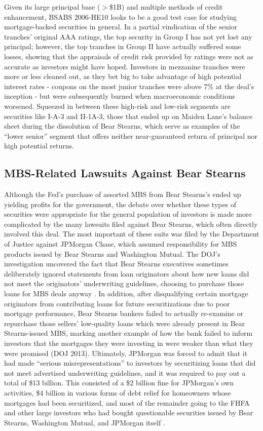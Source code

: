 \documentclass[12pt]{article}
\begin{document}
Given its large principal base ($>$\$1B) and multiple methods of credit enhancement, BSABS 2006-HE10 looks to be a good test case for studying mortgage-backed securities in general. In a partial vindication of the senior tranches’ original AAA ratings, the top security in Group I has not yet lost any principal; however, the top tranches in Group II have actually suffered some losses, showing that the appraisals of credit risk provided by ratings were not as accurate as investors might have hoped. Investors in mezzanine tranches were more or less cleaned out, as they bet big to take advantage of high potential interest rates - coupons on the most junior tranches were above 7\% at the deal’s inception - but were subsequently burned when macroeconomic conditions worsened. Squeezed in between these high-risk and low-risk segments are securities like I-A-3 and II-1A-3, those that ended up on Maiden Lane’s balance sheet during the dissolution of Bear Stearns, which serve as examples of the “lower senior” segment that offers neither near-guaranteed return of principal nor high potential returns.

\subsection*{MBS-Related Lawsuits Against Bear Stearns}

Although the Fed’s purchase of assorted MBS from Bear Stearns’s ended up yielding profits for the government, the debate over whether these types of securities were appropriate for the general population of investors is made more complicated by the many lawsuits filed against Bear Stearns, which often directly involved this deal. The most important of these suits was filed by the Department of Justice against JPMorgan Chase, which assumed responsibility for MBS products issued by Bear Stearns and Washington Mutual. The DOJ’s investigation uncovered the fact that Bear Stearns executives sometimes deliberately ignored statements from loan originators about how new loans did not meet the originators’ underwriting guidelines, choosing to purchase those loans for MBS deals anyway \parencite{ftc08}. In addition, after disqualifying certain mortgage originators from contributing loans for future securitizations due to poor mortgage performance, Bear Stearns bankers failed to actually re-examine or repurchase those sellers’ low-quality loans which were already present in Bear Stearns-issued MBS, marking another example of how the bank failed to inform investors that the mortgages they were investing in were weaker than what they were promised (DOJ 2013). Ultimately, JPMorgan was forced to admit that it had made “serious misrepresentations” to investors by securitizing loans that did not meet advertised underwriting guidelines, and it was required to pay out a total of \$13 billion. This consisted of a \$2 billion fine for JPMorgan’s own activities, \$4 billion in various forms of debt relief for homeowners whose mortgages had been securitized, and most of the remainder going to the FHFA and other large investors who had bought questionable securities issued by Bear Stearns, Washington Mutual, and JPMorgan itself \parencite{eavis13}. 
\end{document}
